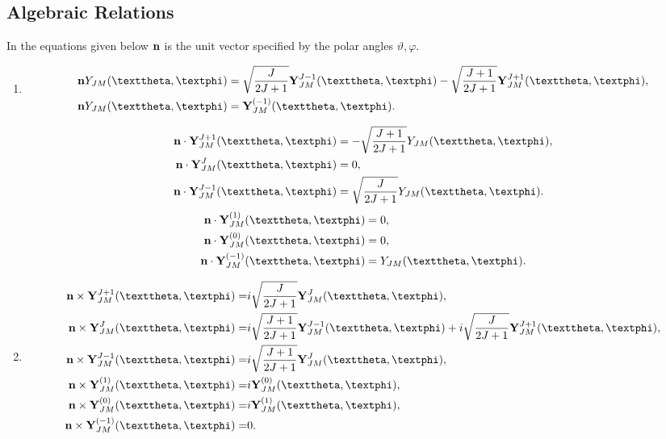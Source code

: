 \subsection{Algebraic Relations}\label{sec:7.3.8}
In the equations given below $\mathbf{n}$ is the unit vector specified by the polar angles $\vartheta, \varphi$.\\
\begin{fleqn}[3cm]
\begin{enumerate}[label=(\alph*)]
\item
\begin{align}
& \vect{n} Y_{J M}(\vartheta, \varphi)=\sqrt{\frac{J}{2 J+1}} \vect{Y}_{J M}^{J-1}(\vartheta, \varphi)-\sqrt{\frac{J+1}{2 J+1}} \vect{Y}_{J M}^{J+1}(\vartheta, \varphi), \notag\\
& \vect{n} Y_{J M}(\vartheta, \varphi)=\vect{Y}_{J M}^{(-1)}(\vartheta, \varphi). \label{eq:7:3:70}
\end{align}

\begin{align}
\vect{n} \cdot \vect{Y}_{J M}^{J+1}(\vartheta, \varphi) & =-\sqrt{\frac{J+1}{2 J+1}} Y_{J M}(\vartheta, \varphi), \notag\\
\vect{n} \cdot \vect{Y}_{J M}^{J}(\vartheta, \varphi) & =0, \label{eq:7:3:71}\\
\vect{n} \cdot \vect{Y}_{J M}^{J-1}(\vartheta, \varphi) & =\sqrt{\frac{J}{2 J+1}} Y_{J M}(\vartheta, \varphi). \notag
\end{align}
\begin{align}
\vect{n} \cdot \vect{Y}_{J M}^{(1)}(\vartheta, \varphi) & =0, \notag\\
\vect{n} \cdot \vect{Y}_{J M}^{(0)}(\vartheta, \varphi) & =0, \label{eq:7:3:72}\\
\vect{n} \cdot \vect{Y}_{J M}^{(-1)}(\vartheta, \varphi) & =Y_{J M}(\vartheta, \varphi). \notag
\end{align}
\item

\begin{align}
\vect{n} \times \vect{Y}_{J M}^{J+1}(\vartheta, \varphi)= & i \sqrt{\frac{J}{2 J+1}} \vect{Y}_{J M}^{J}(\vartheta, \varphi), \notag\\
\vect{n} \times \vect{Y}_{J M}^{J}(\vartheta, \varphi)= & i \sqrt{\frac{J+1}{2 J+1}} \vect{Y}_{J M}^{J-1}(\vartheta, \varphi)+i \sqrt{\frac{J}{2 J+1}} \vect{Y}_{J M}^{J+1}(\vartheta, \varphi), \label{eq:7:3:73}\\
\vect{n} \times \vect{Y}_{J M}^{J-1}(\vartheta, \varphi)= & i \sqrt{\frac{J+1}{2 J+1}} \vect{Y}_{J M}^{J}(\vartheta, \varphi), \notag\\
 \vect{n} \times \vect{Y}_{J M}^{(1)}(\vartheta, \varphi)=&i \vect{Y}_{J M}^{(0)}(\vartheta, \varphi), \notag\\
 \vect{n} \times \vect{Y}_{J M}^{(0)}(\vartheta, \varphi)=&i \vect{Y}_{J M}^{(1)}(\vartheta, \varphi), \label{eq:7:3:74}\\
 \vect{n} \times \vect{Y}_{J M}^{(-1)}(\vartheta, \varphi)=&0. \notag
\end{align}
\end{enumerate}
\end{fleqn}

